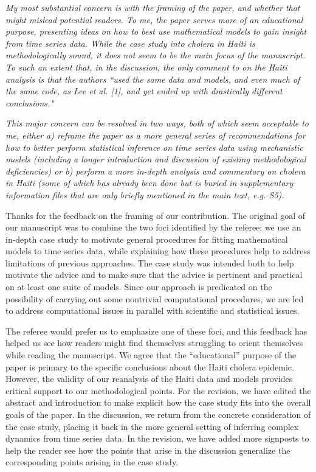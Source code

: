 \documentclass[11pt]{article}
\newcommand\report[1]{{\color{mygreen} \vspace{1mm}\hspace{0.25in}\parbox{6in}{\em #1}}}
\begin{document}
\report{
  My most substantial concern is with the framing of the paper, and whether that might mislead potential readers. To me, the paper serves more of an educational purpose, presenting ideas on how to best use mathematical models to gain insight from time series data. While the case study into cholera in Haiti is methodologically sound, it does not seem to be the main focus of the manuscript. To such an extent that, in the discussion, the only comment to on the Haiti analysis is that the authors ``used the same data and models, and even much of the same code, as Lee et al. [1], and yet ended up with drastically different conclusions."
}


\report{
  This major concern can be resolved in two ways, both of which seem acceptable to me, either a) reframe the paper as a more general series of recommendations for how to better perform statistical inference on time series data using mechanistic models (including a longer introduction and discussion of existing methodological deficiencies) or b) perform a more in-depth analysis and commentary on cholera in Haiti (some of which has already been done but is buried in supplementary information files that are only briefly mentioned in the main text, e.g. S5).
}

Thanks for the feedback on the framing of our contribution.
The original goal of our manuscript was to combine the two foci identified by the referee:
we use an in-depth case study to motivate general procedures for fitting mathematical models to time series data, while explaining how these procedures help to address limitations of previous approaches.
The case study was intended both to help motivate the advice and to make sure that the advice is pertinent and practical on at least one suite of models.
Since our approach is predicated on the possibility of carrying out some nontrivial computational procedures, we are led to address computational issues in parallel with scientific and statistical issues.

The referee would prefer us to emphasize one of these foci, and this feedback has helped us see how readers might find themselves struggling to orient themselves while reading the manuscript.
We agree that the ``educational'' purpose of the paper is primary to the specific conclusions about the Haiti cholera epidemic.
However, the validity of our reanalysis of the Haiti data and models provides critical support to our methodological points.
For the revision, we have edited the abstract and introduction to make explicit how the case study fits into the overall goals of the paper.
In the discussion, we return from the concrete consideration of the case study, placing it back in the more general setting of inferring complex dynamics from time series data.
In the revision, we have added more signposts to help the reader see how the points that arise in the discussion generalize the corresponding points arising in the case study.
\end{document}
